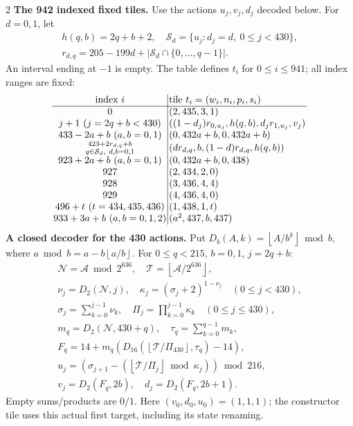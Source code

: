 \documentclass[10pt]{article}
\newcommand{\fl}[1]{\left\lfloor#1\right\rfloor}
\newcommand{\rg}[2]{\{#1,\ldots,#2\}}
\begin{document}
\begin{multicols}{2}
\textbf{The 942 indexed fixed tiles.}
Use the actions $u_j,v_j,d_j$ decoded below. For $d=0,1$, let
\[
\begin{gathered}
h(q,b)=2q+b+2,\quad
\mathcal S_d=\{u_j:d_j=d,\ 0\le j<430\},\\
r_{d,q}=205-199d+|\mathcal S_d\cap\rg0{q-1}|.
\end{gathered}
\]
An interval ending at $-1$ is empty. The table defines $t_i$ for
$0\le i\le941$; all index ranges are fixed:
\[
\setlength{\arraycolsep}{1.4pt}\begin{array}{c|l}
\text{index }i&\text{tile }t_i=(w_i,n_i,p_i,s_i)\\\hline
0&(2,435,3,1)\\
j+1\ (j=2q+b<430)&((1-d_j)r_{0,u_j},h(q,b),d_jr_{1,u_j},v_j)\\
433-2a+b\ (a,b=0,1)&(0,432a+b,0,432a+b)\\
\substack{423+2r_{d,q}+b\\q\in\mathcal S_d,\ d,b=0,1}&(dr_{d,q},b,(1-d)r_{d,q},h(q,b))\\
923+2a+b\ (a,b=0,1)&(0,432a+b,0,438)\\
927&(2,434,2,0)\\
928&(3,436,4,4)\\
929&(4,436,4,0)\\
496+t\ (t=434,435,436)&(1,438,1,t)\\
933+3a+b\ (a,b=0,1,2)&(a^2,437,b,437)
\end{array}
\]
\textbf{A closed decoder for the 430 actions.}
Put $D_b(A,k)=\fl{A/b^k}\bmod b$, where
$a\bmod b=a-b\fl{a/b}$. For $0\le q<215$, $b=0,1$, $j=2q+b$:
\[
\begin{gathered}
\mathcal N=\mathcal A\bmod2^{636},\quad
\mathcal T=\fl{\mathcal A/2^{636}},\\
\nu_j=D_2(\mathcal N,j),\quad \kappa_j=(\sigma_j+2)^{1-\nu_j}\quad(0\le j<430),\\
\sigma_j=\sum_{k=0}^{j-1}\nu_k,\quad
\Pi_j=\prod_{k=0}^{j-1}\kappa_k\quad(0\le j\le430),\\
m_q=D_2(\mathcal N,430+q),\quad \tau_q=\sum_{k=0}^{q-1}m_k,\\
F_q=14+m_q(D_{16}(\fl{\mathcal T/\Pi_{430}},\tau_q)-14),\\
u_j=(\sigma_{j+1}-(\fl{\mathcal T/\Pi_j}\bmod\kappa_j))\bmod216,\\
v_j=D_2(F_q,2b),\quad d_j=D_2(F_q,2b+1).
\end{gathered}
\]
Empty sums/products are $0/1$. Here $(v_0,d_0,u_0)=(1,1,1)$; the constructor tile
uses this actual first target, including its state renaming.


\end{multicols}
\end{document}
